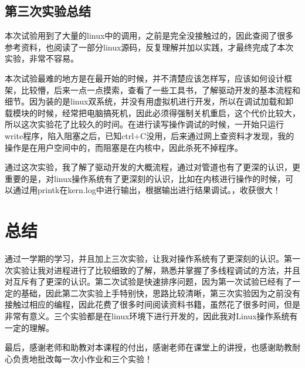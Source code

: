 \documentclass[UTF8]{ctexart}
\begin{document}
\subsection{第三次实验总结}
本次试验用到了大量的linux中的调用，之前是完全没接触过的，因此查阅了很多参考资料，也阅读了一部分linux源码，反复理解并加以实践，才最终完成了本次实验，非常不容易。\par
本次试验最难的地方是在最开始的时候，并不清楚应该怎样写，应该如何设计框架，比较懵，后来一点一点摸索，查看了一些工具书，了解驱动开发的基本流程和细节。因为装的是linux双系统，并没有用虚拟机进行开发，所以在调试加载和卸载模块的时候，经常把电脑搞死机，因此必须得强制关机重启，这个代价比较大，所以这次实验花了比较久的时间。在进行读写操作调试的时候，一开始只运行write程序，陷入阻塞之后，已知ctrl+C没用，后来通过网上查资料才发现，我的操作是在用户空间中的，而阻塞是在内核中，因此杀死不掉程序。\par
通过这次实验，我了解了驱动开发的大概流程，通过对管道也有了更深的认识，更重要的是，对linux操作系统有了更深刻的认识，比如在内核进行操作的时候，可以通过用printk在kern.log中进行输出，根据输出进行结果调试。，收获很大！

\section{总结}
通过一学期的学习，并且加上三次实验，让我对操作系统有了更深刻的认识。第一次实验让我对进程进行了比较细致的了解，熟悉并掌握了多线程调试的方法，并且对互斥有了更深的认识。第二次试验是快速排序问题，因为第一次试验已经有了一定的基础，因此第二次实验上手特别快，思路比较清晰，第三次实验因为之前没有接触过相应的编程，因此花费了很多时间阅读资料书籍，虽然花了很多时间，但是非常有意义。三个实验都是在linux环境下进行开发的，因此我对Linux操作系统有一定的理解。\par
最后，感谢老师和助教对本课程的付出，感谢老师在课堂上的讲授，也感谢助教耐心负责地批改每一次小作业和三个实验！
\end{document}
